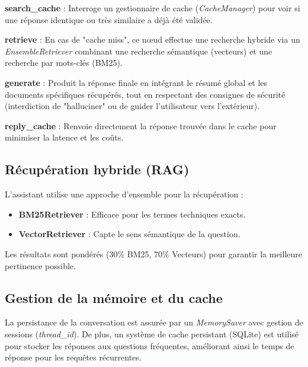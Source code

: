 \documentclass[11pt, letterpaper]{article}
\begin{document}
\textbf{search\_cache} : Interroge un gestionnaire de cache (\textit{CacheManager}) pour voir si une réponse identique ou très similaire a déjà été validée.

\textbf{retrieve} : En cas de "cache miss", ce nœud effectue une recherche hybride via un \textit{EnsembleRetriever} combinant une recherche sémantique (vecteurs) et une recherche par mots-clés (BM25).

\textbf{generate} : Produit la réponse finale en intégrant le résumé global et les documents spécifiques récupérés, tout en respectant des consignes de sécurité (interdiction de "halluciner" ou de guider l'utilisateur vers l'extérieur).

\textbf{reply\_cache} : Renvoie directement la réponse trouvée dans le cache pour minimiser la latence et les coûts.

\subsection{Récupération hybride (RAG)}
L'assistant utilise une approche d'ensemble pour la récupération :
\begin{itemize}
    \item \textbf{BM25Retriever} : Efficace pour les termes techniques exacts.
    \item \textbf{VectorRetriever} : Capte le sens sémantique de la question.
\end{itemize}
Les résultats sont pondérés (30\% BM25, 70\% Vecteurs) pour garantir la meilleure pertinence possible.

\subsection{Gestion de la mémoire et du cache}
La persistance de la conversation est assurée par un \textit{MemorySaver} avec gestion de sessions (\textit{thread\_id}). De plus, un système de cache persistant (SQLite) est utilisé pour stocker les réponses aux questions fréquentes, améliorant ainsi le temps de réponse pour les requêtes récurrentes.
\end{document}
